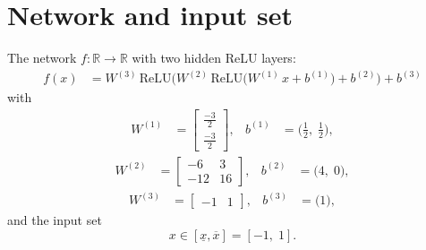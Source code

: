 \documentclass[11pt]{article}
\begin{document}
\section{Network and input set}
The network $f:\mathbb{R} \to \mathbb{R}$ with two hidden ReLU layers:
\begin{align*}
f(x) &= W^{(3)}\,\mathrm{ReLU}\bigl(W^{(2)}\,\mathrm{ReLU}\bigl(W^{(1)}\,x + b^{(1)}\bigr) + b^{(2)}\bigr) + b^{(3)}
\end{align*}
with
\begin{align*}
W^{(1)} &= \begin{bmatrix}
\frac{-3}{2} \\
\frac{-3}{2}
\end{bmatrix}, & b^{(1)} &= \bigl(\frac{1}{2},\; \frac{1}{2}\bigr),
\end{align*}
\begin{align*}
W^{(2)} &= \begin{bmatrix}
-6 & 3 \\
-12 & 16
\end{bmatrix}, & b^{(2)} &= \bigl(4,\; 0\bigr),
\end{align*}
\begin{align*}
W^{(3)} &= \begin{bmatrix}
-1 & 1
\end{bmatrix}, & b^{(3)} &= \bigl(1\bigr),
\end{align*}
and the input set
\begin{equation*}
 x \in [\underline{x}, \overline{x}] = [-1,\; 1].
\end{equation*}
\end{document}
